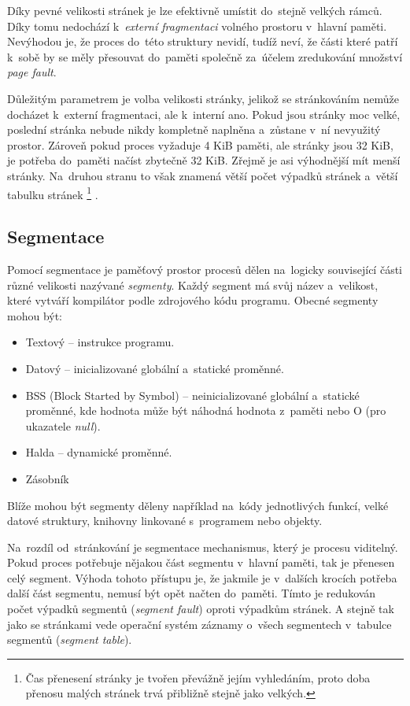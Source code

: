 Díky pevné velikosti stránek je lze efektivně umístit do~stejně velkých rámců. Díky tomu nedochází k~\emph{externí fragmentaci} volného prostoru v~hlavní paměti. Nevýhodou je, že proces do~této struktury nevidí, tudíž neví, že části které patří k~sobě by se měly přesouvat do~paměti společně za~účelem zredukování množství \emph{page fault}.

Důležitým parametrem je volba velikosti stránky, jelikož se stránkováním nemůže docházet k~externí fragmentaci, ale k~interní ano. Pokud jsou stránky moc velké, poslední stránka nebude nikdy kompletně naplněna a~zůstane v~ní nevyužitý prostor. Zároveň pokud proces vyžaduje 4 KiB paměti, ale stránky jsou 32 KiB, je potřeba do~paměti načíst zbytečně 32 KiB. Zřejmě je asi výhodnější mít menší stránky. Na~druhou stranu to však znamená větší počet výpadků stránek a~větší tabulku stránek%
\footnote{Čas přenesení stránky je tvořen převážně jejím vyhledáním, proto doba přenosu malých stránek trvá přibližně stejně jako velkých.}%
.

\subsection{Segmentace}

Pomocí segmentace je paměťový prostor procesů dělen na~logicky související části různé velikosti nazývané \emph{segmenty}. Každý segment má svůj název a~velikost, které vytváří kompilátor podle zdrojového kódu programu. Obecné segmenty mohou být:

\begin{itemize}
	\item Textový -- instrukce programu.
	\item Datový -- inicializované globální a~statické proměnné.
	\item BSS (Block Started by Symbol) -- neinicializované globální a~statické proměnné, kde hodnota může být náhodná hodnota z~paměti nebo O (pro ukazatele \emph{null}).
	\item Halda -- dynamické proměnné.
	\item Zásobník
\end{itemize}

Blíže mohou být segmenty děleny například na~kódy jednotlivých funkcí, velké datové struktury, knihovny linkované s~programem nebo objekty.

Na~rozdíl od~stránkování je segmentace mechanismus, který je procesu viditelný. Pokud proces potřebuje nějakou část segmentu v~hlavní paměti, tak je přenesen celý segment. Výhoda tohoto přístupu je, že jakmile je v~dalších krocích potřeba další část segmentu, nemusí být opět načten do~paměti. Tímto je redukován počet výpadků segmentů (\emph{segment fault}) oproti výpadkům stránek. A stejně tak jako se stránkami vede operační systém záznamy o~všech segmentech v~tabulce segmentů (\emph{segment table}).

